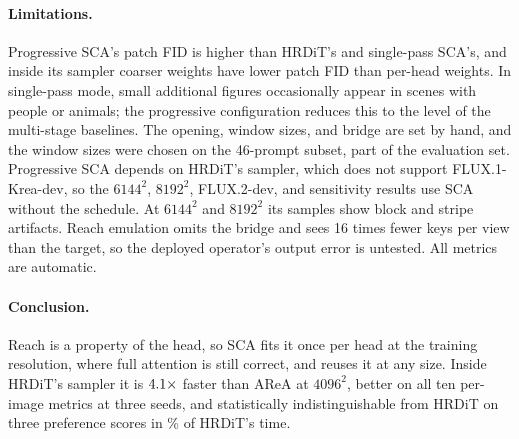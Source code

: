 \documentclass{article} %
\newif\ifresfluxtwo \resfluxtwofalse
\newif\ifresqwen    \resqwenfalse
\newif\ifresideogram \resideogramfalse
\newif\ifanynewmodel
\newcommand{\newmodelList}{%
  \ifresfluxtwo
    \ifresqwen
      \ifresideogram FLUX.2-dev, Qwen-Image, and Ideogram~4\else FLUX.2-dev and Qwen-Image\fi
    \else
      \ifresideogram FLUX.2-dev and Ideogram~4\else FLUX.2-dev\fi
    \fi
  \else
    \ifresqwen
      \ifresideogram Qwen-Image and Ideogram~4\else Qwen-Image\fi
    \else
      \ifresideogram Ideogram~4\fi
    \fi
  \fi}
\newcommand{\sca}{SCA}
\theoremstyle{remark}
\begin{document}
\paragraph{Limitations.} Progressive \sca{}'s patch FID is higher than HRDiT's and single-pass \sca{}'s, and inside its sampler coarser weights have lower patch FID than per-head weights. In single-pass mode, small additional figures occasionally appear in scenes with people or animals; the progressive configuration reduces this to the level of the multi-stage baselines. The opening, window sizes, and bridge are set by hand, and the window sizes were chosen on the 46-prompt subset, part of the evaluation set. Progressive \sca{} depends on HRDiT's sampler, which does not support FLUX.1-Krea-dev, so the $6144^2$, $8192^2$, FLUX.2-dev, and sensitivity results use \sca{} without the schedule. At $6144^2$ and $8192^2$ its samples show block and stripe artifacts. Reach emulation omits the bridge and sees 16 times fewer keys per view than the target, so the deployed operator's output error is untested. All metrics are automatic.

\paragraph{Conclusion.} Reach is a property of the head, so \sca{} fits it once per head at the training resolution, where full attention is still correct, and reuses it at any size. Inside HRDiT's sampler it is $4.1\times$ faster than AReA at $4096^2$, better on all ten per-image metrics at three seeds, and statistically indistinguishable from HRDiT on three preference scores in \hlProgHrditPct\% of HRDiT's time\ifanynewmodel; it also runs on \newmodelList\fi.

\newpage
\end{document}

